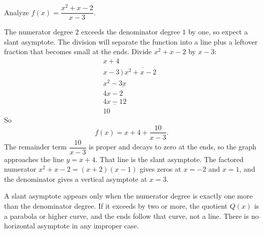 \documentclass[12pt]{book}
\begin{document}
\begin{example}
Analyze $f(x)=\dfrac{x^2+x-2}{x-3}$.

The numerator degree $2$ exceeds the denominator degree $1$ by one, so expect a
slant asymptote. The division will separate the function into a line plus a leftover
fraction that becomes small at the ends. Divide $x^2+x-2$ by $x-3$:
\[
\begin{array}{r}
x+4\phantom{xxxxx}\\
x-3\,\big)\,\overline{x^2+x-2\phantom{x}}\\
\underline{x^2-3x\phantom{xxxx}}\\
4x-2\phantom{x}\\
\underline{4x-12}\\
10\phantom{x}
\end{array}
\]
So
\[
f(x)=x+4+\frac{10}{x-3}.
\]
The remainder term $\dfrac{10}{x-3}$ is proper and decays to zero at the ends, so the
graph approaches the line $y=x+4$. That line is the slant asymptote. The factored
numerator $x^2+x-2=(x+2)(x-1)$ gives zeros at $x=-2$ and $x=1$, and the denominator
gives a vertical asymptote at $x=3$.
\end{example}

\begin{center}
\end{center}

\begin{pitfall}
A slant asymptote appears only when the numerator degree is exactly one more than the
denominator degree. If it exceeds by two or more, the quotient $Q(x)$ is a parabola
or higher curve, and the ends follow that curve, not a line. There is no horizontal
asymptote in any improper case.
\end{pitfall}
\end{document}
